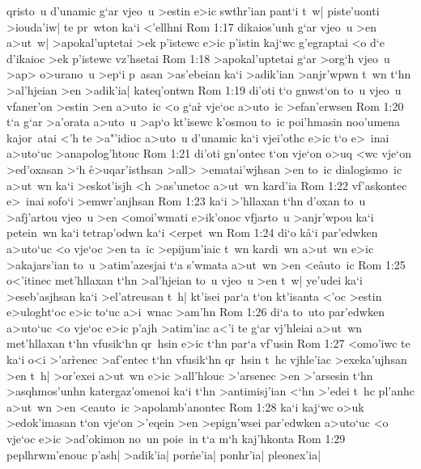 qristo~u
d'unamic
g`ar
vjeo~u
>estin
e>ic
swthr'ian
pant`i
t~w|
piste'uonti
>iouda'iw|
te
pr~wton
ka`i
<'ellhni\bibvsend
\vs Rom 1:17
dikaios'unh
g`ar
vjeo~u
>en
a>ut~w|
>apokal'uptetai
>ek
p'istewc
e>ic
p'istin
kaj`wc
g'egraptai
<o
d`e
d'ikaioc
>ek
p'istewc
vz'hsetai\bibvsend
\vs Rom 1:18
>apokal'uptetai
g`ar
>org`h
vjeo~u
>ap>
o>urano~u
>ep`i
p~asan
>as'ebeian
ka`i
>adik'ian
>anjr'wpwn
t~wn
t`hn
>al'hjeian
>en
>adik'ia|
kateq'ontwn\bibvsend
\vs Rom 1:19
di'oti
t`o
gnwst`on
to~u
vjeo~u
vfaner'on
>estin
>en
a>uto~ic
<o
g`ar\r{}
vje`oc
a>uto~ic
>efan'erwsen\bibvsend
\vs Rom 1:20
t`a
g`ar
>a'orata
a>uto~u
>ap`o
kt'isewc
k'osmou
to~ic
poi'hmasin
noo'umena
kajor~atai
<'h
te
>a"'idioc
a>uto~u
d'unamic
ka`i
vjei'othc
e>ic
t`o
e>~inai
a>uto`uc
>anapolog'htouc\bibvsend
\vs Rom 1:21
di'oti
gn'ontec
t`on
vje`on
o>uq
<wc
vje`on
>ed'oxasan
>`h
\r{e}>uqar'isthsan
>all>
>ematai'wjhsan
>en
to~ic
dialogismo~ic
a>ut~wn
ka`i
>eskot'isjh
<h
>as'unetoc
a>ut~wn
kard'ia\bibvsend
\vs Rom 1:22
vf'askontec
e>~inai
sofo`i
>emwr'anjhsan\bibvsend
\vs Rom 1:23
ka`i
>'hllaxan
t`hn
d'oxan
to~u
>afj'artou
vjeo~u
>en
<omoi'wmati
e>ik'onoc
vfjarto~u
>anjr'wpou
ka`i
petein~wn
ka`i
tetrap'odwn
ka`i
<erpet~wn\bibvsend
\vs Rom 1:24
di`o
k\r{a}`i
par'edwken
a>uto`uc
<o
vje`oc
>en
ta~ic
>epijum'iaic
t~wn
kardi~wn
a>ut~wn
e>ic
>akajars'ian
to~u
>atim'azesjai
t`a
s'wmata
a>ut~wn
>en
<e\r{a}uto~ic\bibvsend
{}
\vs Rom 1:25
o<'itinec
met'hllaxan
t`hn
>al'hjeian
to~u
vjeo~u
>en
t~w|
ye'udei
ka`i
>eseb'asjhsan
ka`i
>el'atreusan
t~h|
kt'isei
par`a
t`on
kt'isanta
<'oc
>estin
e>uloght`oc
e>ic
to`uc
a>i~wnac
>am'hn\bibvsend
\vs Rom 1:26
di`a
to~uto
par'edwken
a>uto`uc
<o
vje`oc
e>ic
p'ajh
>atim'iac
a<'i
te
g`ar
vj'hleiai
a>ut~wn
met'hllaxan
t`hn
vfusik`hn
qr~hsin
e>ic
t`hn
par`a
vf'usin\bibvsend
\vs Rom 1:27
<omo'iwc
te
ka`i
o<i
>'ar\r{r}enec
>af'entec
t`hn
vfusik`hn
qr~hsin
t~hc
vjhle'iac
>exeka'ujhsan
>en
t~h|
>or'exei
a>ut~wn
e>ic
>all'hlouc
>'arsenec
>en
>'arsesin
t`hn
>asqhmos'unhn
katergaz'omenoi
ka`i
t`hn
>antimisj'ian
<`hn
>'edei
t~hc
pl'anhc
a>ut~wn
>en
<eauto~ic
>apolamb'anontec\bibvsend
\vs Rom 1:28
ka`i
kaj`wc
o>uk
>edok'imasan
t`on
vje`on
>'eqein
>en
>epign'wsei
par'edwken
a>uto`uc
<o
vje`oc
e>ic
>ad'okimon
no~un
poie~in
t`a
m`h
kaj'hkonta\bibvsend
\vs Rom 1:29
peplhrwm'enouc
p'ash|
>adik'ia|
por\r{n}e'ia|
ponhr'ia|
pleonex'ia|
